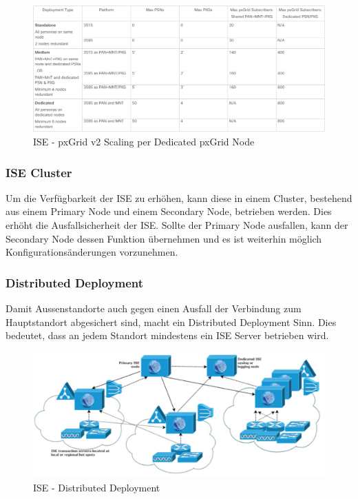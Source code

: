 \begin{figure}[H]
	\centering
	\includegraphics[width=1\linewidth]{img/Absicherung/ISE-PlatformpxGridV2Scaling}
	\caption{ISE - pxGrid v2 Scaling per Dedicated pxGrid Node \cite{ise-scale}}
	\label{fig:ISE - pxGrid v2 Scaling per Dedicated pxGrid Node}
\end{figure}

\subsubsection{ISE Cluster}

Um die Verfügbarkeit der ISE zu erhöhen, kann diese in einem Cluster, bestehend aus einem Primary Node und einem Secondary Node, betrieben werden. Dies erhöht die Ausfallsicherheit der ISE. Sollte der Primary Node ausfallen, kann der Secondary Node dessen Funktion übernehmen und es ist weiterhin möglich Konfigurationsänderungen vorzunehmen.

\subsubsection{Distributed Deployment}

Damit Aussenstandorte auch gegen einen Ausfall der Verbindung zum Hauptstandort abgesichert sind, macht ein Distributed Deployment Sinn. Dies bedeutet, dass an jedem Standort mindestens ein ISE Server betrieben wird. 

\begin{figure}[H]
	\centering
	\includegraphics[width=0.8\linewidth]{img/Absicherung/ISE-Distributed-Deployment.png}
	\caption{ISE - Distributed Deployment \cite{ise-install-guide}}
	\label{fig:ISE - Distributed Deployment}
\end{figure}

